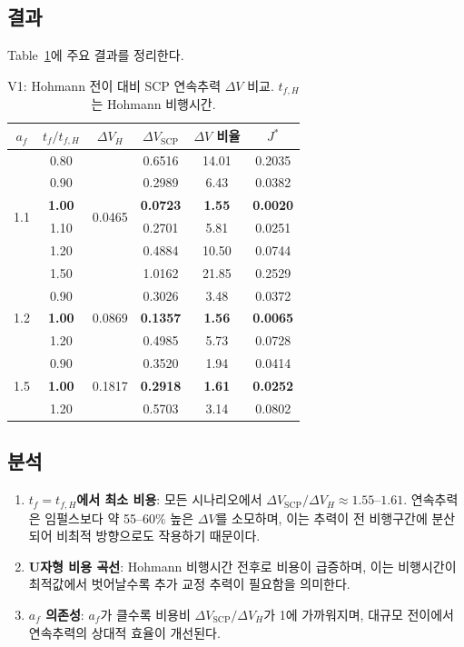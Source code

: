 \documentclass[11pt]{article}
\begin{document}
\subsection{결과}

Table~\ref{tab:v1}에 주요 결과를 정리한다.

\begin{table}[h]
\centering
\caption{V1: Hohmann 전이 대비 SCP 연속추력 $\Delta V$ 비교. $t_{f,H}$는 Hohmann 비행시간.}
\label{tab:v1}
\small
\begin{tabular}{@{}cccccc@{}}
\toprule
$a_f$ & $t_f/t_{f,H}$ & $\Delta V_H$ & $\Delta V_{\text{SCP}}$ & $\Delta V$ 비율 & $J^*$ \\
\midrule
\multirow{6}{*}{1.1}
  & 0.80 & \multirow{6}{*}{0.0465} & 0.6516 & 14.01 & 0.2035 \\
  & 0.90 &  & 0.2989 & 6.43 & 0.0382 \\
  & \textbf{1.00} &  & \textbf{0.0723} & \textbf{1.55} & \textbf{0.0020} \\
  & 1.10 &  & 0.2701 & 5.81 & 0.0251 \\
  & 1.20 &  & 0.4884 & 10.50 & 0.0744 \\
  & 1.50 &  & 1.0162 & 21.85 & 0.2529 \\
\midrule
\multirow{3}{*}{1.2}
  & 0.90 & \multirow{3}{*}{0.0869} & 0.3026 & 3.48 & 0.0372 \\
  & \textbf{1.00} &  & \textbf{0.1357} & \textbf{1.56} & \textbf{0.0065} \\
  & 1.20 &  & 0.4985 & 5.73 & 0.0728 \\
\midrule
\multirow{3}{*}{1.5}
  & 0.90 & \multirow{3}{*}{0.1817} & 0.3520 & 1.94 & 0.0414 \\
  & \textbf{1.00} &  & \textbf{0.2918} & \textbf{1.61} & \textbf{0.0252} \\
  & 1.20 &  & 0.5703 & 3.14 & 0.0802 \\
\bottomrule
\end{tabular}
\end{table}

\subsection{분석}

\begin{enumerate}
  \item \textbf{$t_f = t_{f,H}$에서 최소 비용}: 모든 시나리오에서 $\Delta V_{\text{SCP}}/\Delta V_H \approx 1.55$--$1.61$.
        연속추력은 임펄스보다 약 55--60\% 높은 $\Delta V$를 소모하며,
        이는 추력이 전 비행구간에 분산되어 비최적 방향으로도 작용하기 때문이다.
  \item \textbf{U자형 비용 곡선}: Hohmann 비행시간 전후로 비용이 급증하며,
        이는 비행시간이 최적값에서 벗어날수록 추가 교정 추력이 필요함을 의미한다.
  \item \textbf{$a_f$ 의존성}: $a_f$가 클수록 비용비 $\Delta V_{\text{SCP}}/\Delta V_H$가
        1에 가까워지며, 대규모 전이에서 연속추력의 상대적 효율이 개선된다.
\end{enumerate}
\end{document}
